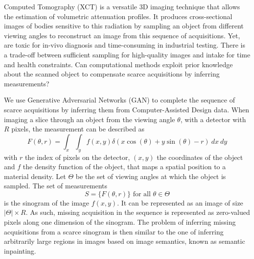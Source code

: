 \documentclass[../main.tex]{subfiles}
\begin{document}
 Computed Tomography (XCT) is a versatile 3D imaging technique that allows the estimation of volumetric \xr attenuation profiles. It produces cross-sectional images of bodies sensitive to this radiation by sampling an object from different viewing angles to reconstruct an image from this sequence of acquisitions. Yet, \xrs are toxic for in-vivo diagnosis and time-consuming in industrial testing. There is a trade-off between sufficient sampling for high-quality images and \xr intake for time and health constraints. Can computational methods exploit prior knowledge about the scanned object to compensate scarce acquisitions by inferring measurements?

We use Generative Adversarial Networks (GAN) to complete the sequence of scarce acquisitions by inferring them from Computer-Assisted Design data. When imaging a slice through an object from the viewing angle $\theta$, with a detector with $R$ pixels, the measurement can be described as
\begin{equation*}
F(\theta,r) = \int_{x} \int_{y}  f(x, y) \delta(x \cos(\theta) + y \sin(\theta) -r )  \ dx \ dy
\end{equation*}
with $r$ the index of pixels on the detector, $(x,y)$ the coordinates of the object and $f$ the density function of the object, that maps a spatial position to a material density. Let $\Theta$ be the set of viewing angles at which the object is sampled. The set of measurements
\begin{equation*}
	S=\{F(\theta,r)\} \textrm{ for all } \theta \in \Theta
\end{equation*} 
is the sinogram of the image $f(x, y)$. It can be represented as an image of size $\vert \Theta \vert \times R$. As such, missing acquisition in the sequence is represented as zero-valued pixels along one dimension of the sinogram. The problem of inferring missing acquisitions from a scarce sinogram is then similar to the one of inferring arbitrarily large regions in images based on image semantics, known as semantic inpainting.
\end{document}
